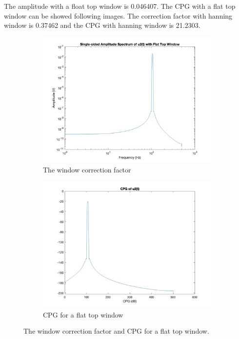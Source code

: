 \documentclass[
	a4paper,
	11pt,
]{article}
\begin{document}
The amplitude with a float top window is 0.046407.
The CPG with a flat top window can be showed following images. The correction factor with hanning window is 0.37462 and the CPG with hanning window is 21.2303.
\newpage


\begin{figure}[hbt!]
  \centering
  \begin{subfigure}[b]{0.45\textwidth}
    \centering
    \includegraphics[width=\linewidth]{A5/a5.falttopw.jpg}
    \caption{The window correction factor}
    \label{fig:sub1}
  \end{subfigure}
  \hfill
  \begin{subfigure}[b]{0.45\textwidth}
    \centering
    \includegraphics[width=\linewidth]{A5/a5.cpg.jpg}
    \caption{CPG for a flat top window}
    \label{fig:sub2}
  \end{subfigure}
  \caption{The window correction factor and CPG for a flat top window.}
  \label{fig:example}
\end{figure}
\end{document}
